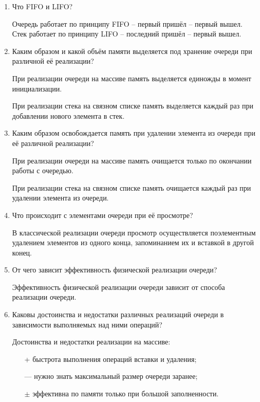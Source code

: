 \begin{enumerate}
	\item Что FIFO и LIFO?
	
	Очередь работает по принципу FIFO  --  первый пришёл -- первый вышел. Стек работает по принципу LIFO -- последний пришёл -- первый вышел.
	
	\item Каким образом и какой объём памяти выделяется под хранение очереди при различной её реализации?
	
	При реализации очереди на массиве память выделяется  единожды в момент инициализации. 
	
	При реализации стека на связном списке память выделяется каждый раз при добавлении нового элемента в стек.
	
	\item Каким образом освобождается память при удалении элемента из очереди при её различной реализации?
	
	При  реализации  очереди  на  массиве  память  очищается  только  по окончании работы с очередью. 
	
	При реализации стека на связном списке память очищается каждый раз при удалении элемента из очереди. 
	
	\item Что происходит с элементами очереди при её просмотре?
	
	В  классической  реализации  очереди  просмотр  осуществляется поэлементным удалением элементов из одного конца, запоминанием их и вставкой в другой конец. 
	
	\item От чего зависит эффективность физической реализации очереди?
	
	Эффективность физической реализации очереди зависит от способа реализации очереди.
	
	\item Каковы достоинства и недостатки различных реализаций очереди в зависимости выполняемых над ними операций?
	
	Достоинства и недостатки реализации на массиве:
	
	\begin{itemize}
		\item[+] быстрота выполнения операций вставки и удаления;
		\item[---] нужно знать максимальный размер очереди заранее;
		\item[$\pm$] эффективна по памяти только при большой заполненности.
	\end{itemize} 
	 

\end{enumerate}
